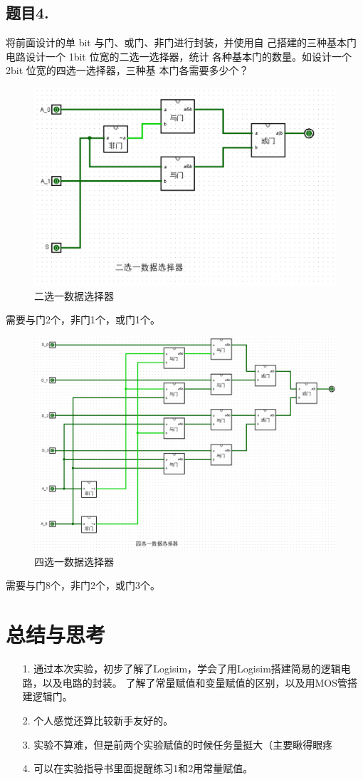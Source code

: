 \documentclass{article}
\begin{document}
		\subsection*{题目4.}将前面设计的单 bit 与门、或门、非门进行封装，并使用自
		己搭建的三种基本门电路设计一个 1bit 位宽的二选一选择器，统计
		各种基本门的数量。如设计一个 2bit 位宽的四选一选择器，三种基
		本门各需要多少个？
		\begin{figure}[H]
			\centering
			\includegraphics[scale=0.8]{1-4-1.png}
			\caption*{二选一数据选择器}
		\end{figure}
		需要与门2个，非门1个，或门1个。
		\begin{figure}[H]
			\centering
			\includegraphics[scale=0.45]{1-4-2.png}
			\caption*{四选一数据选择器}
		\end{figure}
		需要与门8个，非门2个，或门3个。
	\clearpage
    \section{总结与思考}
	\begin{enumerate}
		\item [1.]通过本次实验，初步了解了Logisim，学会了用Logisim搭建简易的逻辑电路，以及电路的封装。
		了解了常量赋值和变量赋值的区别，以及用MOS管搭建逻辑门。
		\item [2.]个人感觉还算比较新手友好的。
		\item [3.]实验不算难，但是前两个实验赋值的时候任务量挺大（主要瞅得眼疼
		\item [4.]可以在实验指导书里面提醒练习1和2用常量赋值。
	\end{enumerate}
\end{document}
